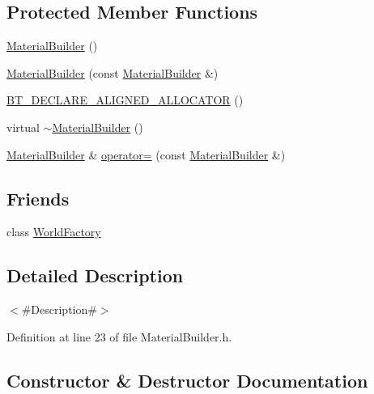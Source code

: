 \subsection*{Protected Member Functions}
\begin{DoxyCompactItemize}
\item 
\mbox{\hyperlink{classnjli_1_1_material_builder_abf72495ee49aa1fdd9accd45aee1fd94}{Material\+Builder}} ()
\item 
\mbox{\hyperlink{classnjli_1_1_material_builder_a15ee94e543a5dd5c30474be74b4c221b}{Material\+Builder}} (const \mbox{\hyperlink{classnjli_1_1_material_builder}{Material\+Builder}} \&)
\item 
\mbox{\hyperlink{classnjli_1_1_material_builder_acbf454f4aeead5d80c59474b3dcedda6}{B\+T\+\_\+\+D\+E\+C\+L\+A\+R\+E\+\_\+\+A\+L\+I\+G\+N\+E\+D\+\_\+\+A\+L\+L\+O\+C\+A\+T\+OR}} ()
\item 
virtual \mbox{\hyperlink{classnjli_1_1_material_builder_acce429eca2de8ade08f8ed50bc630400}{$\sim$\+Material\+Builder}} ()
\item 
\mbox{\hyperlink{classnjli_1_1_material_builder}{Material\+Builder}} \& \mbox{\hyperlink{classnjli_1_1_material_builder_aaa2c67d1966ebcea7277957e918ed831}{operator=}} (const \mbox{\hyperlink{classnjli_1_1_material_builder}{Material\+Builder}} \&)
\end{DoxyCompactItemize}
\subsection*{Friends}
\begin{DoxyCompactItemize}
\item 
class \mbox{\hyperlink{classnjli_1_1_material_builder_acb96ebb09abe8f2a37a915a842babfac}{World\+Factory}}
\end{DoxyCompactItemize}


\subsection{Detailed Description}
$<$\#\+Description\#$>$ 

Definition at line 23 of file Material\+Builder.\+h.



\subsection{Constructor \& Destructor Documentation}
\mbox{\label{classnjli_1_1_material_builder_abf72495ee49aa1fdd9accd45aee1fd94}} 
